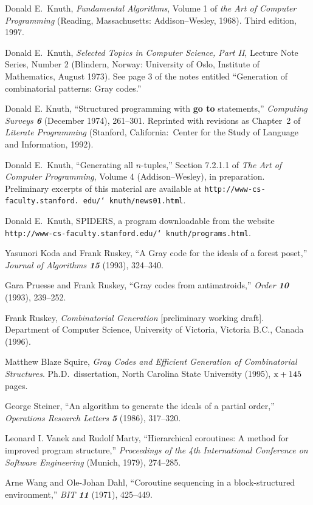 \bigskip\noindent
[\Ki] Donald E.\ Knuth, {\sl Fundamental Algorithms}, Volume
1 of {\sl the Art of Computer Programming\/} (Reading,
Massachusetts: Addison--Wesley, 1968).  Third edition, 1997.

\bigskip\noindent
[\KO] Donald E.\ Knuth, {\sl Selected Topics in Computer
Science, Part II}, Lecture Note Series, Number 2
(Blindern, Norway: University of Oslo, Institute of
Mathematics, August 1973). See page 3 of the notes entitled
``Generation of combinatorial patterns: Gray codes.''

\bigskip\noindent
[\Ksp] Donald E. Knuth, ``Structured programming with {\bf go to}
statements,'' {\sl Computing Surveys\/ \bf 6} (December 1974),
261--301. Reprinted with revisions as
Chapter~2 of {\sl Literate Programming\/} (Stanford, California:\
Center for the Study of Language and Information, 1992).

\bigskip\noindent
[\Kiv] Donald E.\ Knuth, ``Generating all $n$-tuples,''
Section 7.2.1.1 of {\sl The Art of Computer Programming},
Volume 4 (Addison--Wesley), in preparation. Preliminary
excerpts of this material are available at 
{\tt http://www-cs-faculty.stanford.\allowbreak
edu/\char`~knuth/news01.html}.

\bigskip\noindent
[\Spiders] Donald E.\ Knuth, {\mc SPIDERS}, a program downloadable
from the website\hfill\break\null\qquad
{\tt http://www-cs-faculty.stanford.edu/\char`~knuth/programs.html}.

\bigskip\noindent
[\KR] Yasunori Koda and Frank Ruskey, ``A Gray code for the
ideals of a forest poset,'' 
{\sl Journal of Algorithms\/ \bf 15} (1993), 324--340.

\bigskip\noindent
[\PR] Gara Pruesse and Frank Ruskey, ``Gray codes from antimatroids,''
{\sl Order\/ \bf10} (1993), 239--252.

\bigskip\noindent
[\Ruskey] Frank Ruskey, {\sl Combinatorial Generation\/}
[preliminary working draft].  Department of Computer
Science, University of Victoria, Victoria B.C., Canada
(1996).

\bigskip\noindent
[\Squire] Matthew Blaze Squire, {\sl Gray Codes and
Efficient Generation of Combinatorial Structures}. Ph.D.\
dissertation, North Carolina State University (1995), $\rm
x+145$ pages.

\bigskip\noindent
[\Steiner] George Steiner, ``An algorithm to generate the
ideals of a partial order,'' {\sl Operations Research
Letters\/ \bf 5} (1986), 317--320. 

\bigskip\noindent
[\VM] Leonard I. Vanek and Rudolf Marty, ``Hierarchical coroutines: A method
for improved program structure,'' {\sl Proceedings of the 4th International
Conference on Software Engineering\/} (Munich, 1979), 274--285.

\bigskip\noindent
[\WD] Arne Wang and Ole-Johan Dahl, ``Coroutine sequencing in a
block-structured environment,'' {\sl BIT\/ \bf11} (1971), 425--449.

\bye

